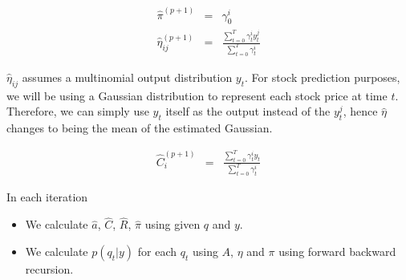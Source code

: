\begin{eqnarray*}
\hat{\pi}^{(p+1)} &=& \gamma_0^i\\
\hat{\eta}_{ij}^{(p+1)} &=& \frac{\sum_{t=0}^T\gamma_{t}^i y_t^j}{\sum_{t=0}^T\gamma_{t}^i}
\end{eqnarray*}

$\hat{\eta}_{ij}$ assumes a multinomial output distribution $y_t$. For stock
prediction purposes, we will be using a Gaussian distribution to represent
each stock price at time $t$. Therefore, we can simply use $y_t$ itself as the
output instead of the $y_t^j$, hence $\hat{\eta}$ changes to being the mean of
the estimated Gaussian.

\begin{eqnarray*}
\hat{C}_{i}^{(p+1)} &=& \frac{\sum_{t=0}^T\gamma_{t}^i y_t}{\sum_{t=0}^T\gamma_{t}^i}
\end{eqnarray*}

In each iteration

\begin{itemize}
   \item We calculate $\hat{a}$, $\hat{C}$, $\hat{R}$, $\hat{\pi}$ using given
     $q$ and $y$.
   \item We calculate $p(q_t|y)$ for each $q_t$ using $A$, $\eta$ and $\pi$ using
   forward backward recursion.
\end{itemize}
